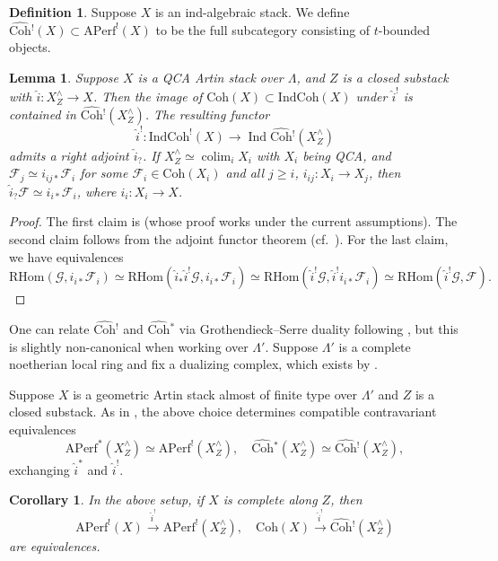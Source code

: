 \documentclass{amsart}
\newtheorem{lemma}[theorem]{Lemma}
\newtheorem{corollary}[theorem]{Corollary}
\theoremstyle{definition}
\newtheorem{definition}[theorem]{Definition}
\theoremstyle{remark}
\numberwithin{equation}{section}
\DeclareMathOperator{\Ind}{Ind}
\DeclareMathOperator{\colim}{colim}
\newcommand{\mc}{\mathcal}
\newcommand{\wh}{\widehat}
\newcommand{\IndCoh}{\mathrm{IndCoh}}
\newcommand{\RHom}{\mathrm{RHom}}
\newcommand{\Coh}{\mathrm{Coh}}
\newcommand{\Aperf}{\mathrm{APerf}}
\begin{document}
\begin{definition}
Suppose $X$ is an ind-algebraic stack. We define $\wh{\Coh}{}^!(X)\subset \Aperf^!(X)$ to be the full subcategory consisting of $t$-bounded objects.  
\end{definition}

\begin{lemma}\label{lem:right_adjoint_from_hatCoh}
Suppose $X$ is a QCA Artin stack over $\Lambda$, and $Z$ is a closed substack with $\wh{i}\colon X^\wedge_Z\to X$. Then
the image of $\Coh(X)\subset \IndCoh(X)$ under $\wh i^!$ is contained in $\wh{\Coh}{}^!(X^\wedge_Z)$. 
The resulting functor
\[
\wh{i}^!\colon \IndCoh^!(X) \to \Ind\wh{\Coh}{}^! (X^\wedge_Z)
\]
admits a right adjoint $\wh{i}_?$. If $X^\wedge_Z\simeq \colim_i X_i$ with $X_i$ being QCA, and  $\mc F_j \simeq i_{ij*}\mc F_i$ for some $\mc F_i\in \Coh(X_i)$ and all $j\geq i$, $i_{ij}\colon X_i\to X_j$, then $\wh{i}_? \mc F\simeq i_{i*} \mc F_i$, where $i_i\colon X_i\to X$.  
\end{lemma}

\begin{proof}
The first claim is \cite[Lemma 2.3.7]{chendhillon} (whose proof works under the current assumptions). The second claim follows from the adjoint functor theorem (cf.~\cite[\S A.2.1]{BCHNconstructible}). For the last claim, we have equivalences
\[
\RHom (\mc G, i_{i*}\mc F_i)\simeq
\RHom (\wh{i}_* \wh{i}^!\mc G, i_{i*}\mc F_i)\simeq
\RHom (\wh{i}^!\mc G, \wh{i}^! i_{i*}\mc F_i)\simeq 
\RHom (\wh{i}^!\mc G, \mc F). 
\]
\end{proof}

One can relate $\wh{\Coh}{}^!$ and $\wh{\Coh}{}^*$ via Grothendieck--Serre duality following \cite{chendhillon}, but this is slightly non-canonical when working over $\Lambda'$. Suppose $\Lambda'$ is a complete noetherian local ring and fix a dualizing complex, which exists by \cite[\href{https://stacks.math.columbia.edu/tag/0BFR}{Tag 0BFR}]{StacksProject}.

Suppose $X$ is a geometric Artin stack almost of finite type over $\Lambda'$ and $Z$ is a closed substack. 
As in \cite[Corollary 2.3.5]{chendhillon}, the above choice determines compatible contravariant equivalences
\[
\Aperf^* (X^\wedge_Z) \simeq \Aperf^! (X^\wedge_Z), \quad \wh{\Coh}{}^*(X^\wedge_Z)\simeq \wh{\Coh}{}^!(X^\wedge_Z),
\]
exchanging $\wh{i}^*$ and $\wh{i}^!$. 

\begin{corollary}{\label{cor: cohhatcompletion}}
In the above setup, if $X$ is complete along $Z$, then
\[
\Aperf^! (X)\xrightarrow{\wh{i}^!} \Aperf^! (X^\wedge_Z), \quad
\Coh (X) \xrightarrow{\wh{i}^!} \wh{\Coh}{}^! (X^\wedge_Z)
\]
are equivalences. 
\end{corollary}
\end{document}
